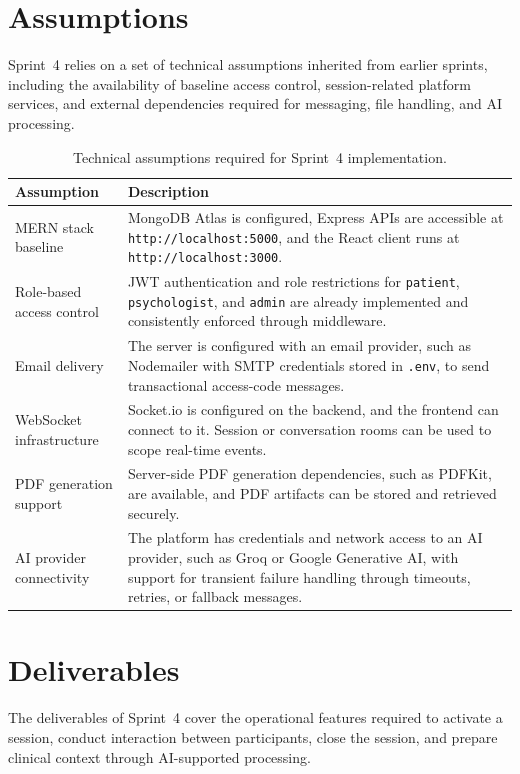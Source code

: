 \documentclass[a4paper,12pt]{report}
\begin{document}
\section{Assumptions}
Sprint~4 relies on a set of technical assumptions inherited from earlier sprints, including the availability of baseline access control, session-related platform services, and external dependencies required for messaging, file handling, and AI processing.

\begin{table}[H]
\centering
\begin{tabular}{@{} L{0.28\textwidth} L{0.64\textwidth} @{}}
\toprule
\textbf{Assumption} &
\textbf{Description} \\
\midrule
MERN stack baseline &
MongoDB Atlas is configured, Express APIs are accessible at \texttt{http://localhost:5000}, and the React client runs at \texttt{http://localhost:3000}. \\
Role-based access control &
JWT authentication and role restrictions for \texttt{patient}, \texttt{psychologist}, and \texttt{admin} are already implemented and consistently enforced through middleware. \\
Email delivery &
The server is configured with an email provider, such as Nodemailer with SMTP credentials stored in \texttt{.env}, to send transactional access-code messages. \\
WebSocket infrastructure &
Socket.io is configured on the backend, and the frontend can connect to it. Session or conversation rooms can be used to scope real-time events. \\
PDF generation support &
Server-side PDF generation dependencies, such as PDFKit, are available, and PDF artifacts can be stored and retrieved securely. \\
AI provider connectivity &
The platform has credentials and network access to an AI provider, such as Groq or Google Generative AI, with support for transient failure handling through timeouts, retries, or fallback messages. \\
\bottomrule
\end{tabular}
\caption{Technical assumptions required for Sprint~4 implementation.}
\label{tab:sprint4-assumptions}
\end{table}

\section{Deliverables}
The deliverables of Sprint~4 cover the operational features required to activate a session, conduct interaction between participants, close the session, and prepare clinical context through AI-supported processing.
\end{document}
